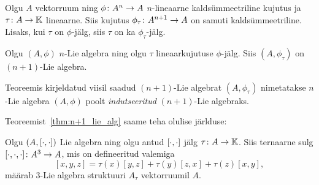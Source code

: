 \begin{lemma}
    Olgu $A$ vektorruum ning $\phi \colon A^n \to A$ $n$-lineaarne kaldsümmeetriline kujutus
    ja $\tau \colon A \to \mathbb{K}$ lineaarne. Siis kujutus
    $\phi_\tau \colon A^{n+1} \to A$ on samuti kaldsümmeetriline. Lisaks,
    kui $\tau$ on $\phi$-jälg, siis $\tau$ on ka $\phi_\tau$-jälg.
\end{lemma}

\begin{thm}\label{thm:n+1_lie_alg}
    Olgu $(A, \phi)$ $n$-Lie algebra ning olgu $\tau$ lineaarkujutuse
    $\phi$-jälg. Siis $(A, \phi_\tau)$ on $(n+1)$-Lie algebra.
\end{thm}

Teoreemis kirjeldatud viisil saadud $(n+1)$-Lie algebrat $(A, \phi_\tau)$
nimetatakse $n$-Lie algebra $(A, \phi)$ poolt \emph{indutseeritud}
$(n+1)$-Lie algebraks.

Teoreemist~\ref{thm:n+1_lie_alg} saame teha olulise järlduse:

\begin{jar}
    Olgu $(A, \left[ \cdot, \cdot \right])$ Lie algebra ning olgu antud
    $\left[ \cdot, \cdot \right]$ jälg $\tau \colon A \to \mathbb{K}$. Siis ternaarne sulg
    $[ \cdot, \cdot, \cdot ] \colon A^3 \to A$, mis on defineeritud
    valemiga
    \[
        [x, y, z] = \tau(x)[y, z] + \tau(y)[z, x] + \tau(z)[x, y],
    \]
    määrab $3$-Lie algebra struktuuri $A_\tau$ vektorruumil $A$.
\end{jar}
